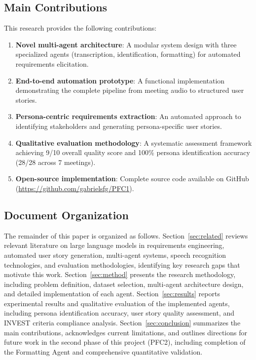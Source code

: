 \documentclass[12pt]{article}
\begin{document}
\subsection{Main Contributions}

This research provides the following contributions:

\begin{enumerate}
    \item \textbf{Novel multi-agent architecture}: A modular system design with three specialized agents (transcription, identification, formatting) for automated requirements elicitation.
    
    \item \textbf{End-to-end automation prototype}: A functional implementation demonstrating the complete pipeline from meeting audio to structured user stories.
    
    \item \textbf{Persona-centric requirements extraction}: An automated approach to identifying stakeholders and generating persona-specific user stories.
    
    \item \textbf{Qualitative evaluation methodology}: A systematic assessment framework achieving 9/10 overall quality score and 100\% persona identification accuracy (28/28 across 7 meetings).
    
    \item \textbf{Open-source implementation}: Complete source code available on GitHub (\url{https://github.com/gabrielsfg/PFC1}).
\end{enumerate}

\subsection{Document Organization}

The remainder of this paper is organized as follows. Section~\ref{sec:related} reviews relevant literature on large language models in requirements engineering, automated user story generation, multi-agent systems, speech recognition technologies, and evaluation methodologies, identifying key research gaps that motivate this work. Section~\ref{sec:method} presents the research methodology, including problem definition, dataset selection, multi-agent architecture design, and detailed implementation of each agent. Section~\ref{sec:results} reports experimental results and qualitative evaluation of the implemented agents, including persona identification accuracy, user story quality assessment, and INVEST criteria compliance analysis. Section~\ref{sec:conclusion} summarizes the main contributions, acknowledges current limitations, and outlines directions for future work in the second phase of this project (PFC2), including completion of the Formatting Agent and comprehensive quantitative validation.
\end{document}
